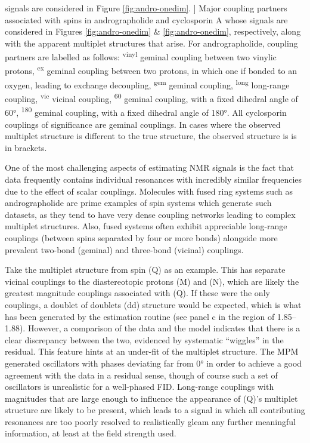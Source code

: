 \begin{table}
    signals are considered in Figure \ref{fig:andro-onedim}.
]{
    Major coupling partners associated with spins in andrographolide and
    cyclosporin A whose
    signals are considered in Figures \ref{fig:andro-onedim} \&
    \ref{fig:andro-onedim}, respectively, along with the
    apparent multiplet structures that arise.
    For andrographolide,
    coupling partners are labelled as follows:
    \textsuperscript{vinyl} geminal coupling between two vinylic protons,
    \textsuperscript{ex} geminal coupling between two protons, in which one
    if bonded to an oxygen, leading to exchange decoupling,
    \textsuperscript{gem} geminal coupling,
    \textsuperscript{long} long-range coupling,
    \textsuperscript{vic} vicinal coupling,
    \textsuperscript{60} geminal coupling, with a fixed dihedral angle of \ang{60},
    \textsuperscript{180} geminal coupling, with a fixed dihedral angle of \ang{180}.
    All cyclosporin couplings of significance are geminal couplings.
    In cases where the observed multiplet structure is different to the true
    structure, the observed structure is is in brackets.
}
\label{tab:andro-multiplets}
\end{table}
One of the most challenging aspects of estimating \ac{NMR} signals is
the fact that data frequently contains individual resonances with incredibly
similar frequencies due to the effect of scalar couplings. Molecules
with fused ring systems such as andrographolide are prime examples of spin
systems which generate such datasets, as they tend to have very dense coupling
networks leading to complex multiplet structures. Also, fused systems often
exhibit appreciable long-range couplings (between spins separated by four or more bonds) alongside more prevalent two-bond (geminal) and three-bond (vicinal) couplings.

Take the multiplet structure from spin (Q) as an example.
This has separate vicinal couplings to the
diastereotopic protons (M) and (N), which are likely the greatest magnitude couplings
associated with (Q). If these were the only couplings, a doublet of doublets
(dd) structure would be expected, which is what has been generated by
the estimation routine (see panel c in the region of
\SIrange{1.85}{1.88}{\partspermillion}). However, a comparison of the data and
the model indicates that there is a clear discrepancy between the two,
evidenced by systematic ``wiggles'' in the residual. This feature hints at an
under-fit of the multiplet structure.
The \ac{MPM} generated oscillators with phases deviating far from \ang{0} in
order to achieve a good agreement with the data in a residual sense, though of
course such a set of oscillators is unrealistic for a well-phased \ac{FID}.
Long-range couplings with magnitudes that are large enough to influence the
appearance of (Q)'s multiplet structure are likely to be present, which leads
to a signal in which all contributing resonances are too poorly resolved to
realistically gleam any further meaningful information, at least at the field
strength used.

